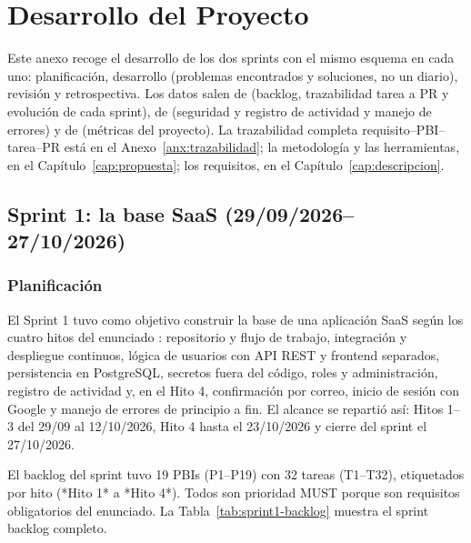 \chapter{Desarrollo del Proyecto}
\label{anx:desarrollo}

Este anexo recoge el desarrollo de los dos sprints con el mismo esquema en cada uno: planificación, desarrollo (problemas encontrados y soluciones, no un diario), revisión y retrospectiva. Los datos salen de  (backlog, trazabilidad tarea a PR y evolución de cada sprint), de  (seguridad y registro de actividad y manejo de errores) y de  (métricas del proyecto). La trazabilidad completa requisito--PBI--tarea--PR está en el Anexo~\ref{anx:trazabilidad}; la metodología y las herramientas, en el Capítulo~\ref{cap:propuesta}; los requisitos, en el Capítulo~\ref{cap:descripcion}.

\section{Sprint 1: la base SaaS (29/09/2026--27/10/2026)}

\subsection{Planificación}

El Sprint 1 tuvo como objetivo construir la base de una aplicación SaaS según los cuatro hitos del enunciado \cite{enunciado}: repositorio y flujo de trabajo, integración y despliegue continuos, lógica de usuarios con API REST y frontend separados, persistencia en PostgreSQL, secretos fuera del código, roles y administración, registro de actividad y, en el Hito 4, confirmación por correo, inicio de sesión con Google y manejo de errores de principio a fin. El alcance se repartió así: Hitos 1--3 del 29/09 al 12/10/2026, Hito 4 hasta el 23/10/2026 y cierre del sprint el 27/10/2026.

El backlog del sprint tuvo 19 PBIs (P1--P19) con 32 tareas (T1--T32), etiquetados por hito (*Hito 1* a *Hito 4*). Todos son prioridad MUST porque son requisitos obligatorios del enunciado. La Tabla~\ref{tab:sprint1-backlog} muestra el sprint backlog completo.

